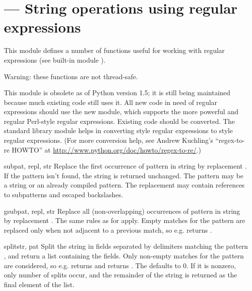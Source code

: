 \section{ ---
         String operations using regular expressions}



This module defines a number of functions useful for working with
regular expressions (see built-in module ).

Warning: these functions are not thread-safe.

This module is obsolete as of Python version 1.5; it is still being
maintained because much existing code still uses it.  All new code in
need of regular expressions should use the new  module, which
supports the more powerful and regular Perl-style regular expressions.
Existing code should be converted.  The standard library module
 helps in converting  style regular
expressions to  style regular expressions.  (For more
conversion help, see Andrew Kuchling's
``regex-to-re HOWTO'' at
\url{http://www.python.org/doc/howto/regex-to-re/}.)


\begin{funcdesc}{sub}{pat, repl, str}
Replace the first occurrence of pattern  in string
 by replacement .  If the pattern isn't found,
the string is returned unchanged.  The pattern may be a string or an
already compiled pattern.  The replacement may contain references
 to subpatterns and escaped backslashes.
\end{funcdesc}

\begin{funcdesc}{gsub}{pat, repl, str}
Replace all (non-overlapping) occurrences of pattern  in
string  by replacement .  The same rules as for
 apply.  Empty matches for the pattern are replaced only
when not adjacent to a previous match, so e.g.
 returns .
\end{funcdesc}

\begin{funcdesc}{split}{str, pat}
Split the string  in fields separated by delimiters matching
the pattern , and return a list containing the fields.  Only
non-empty matches for the pattern are considered, so e.g.
 returns \code{['a', 'b']} and
 returns \code{['abc']}.  The 
defaults to 0. If it is nonzero, only  number of splits
occur, and the remainder of the string is returned as the final
element of the list.
\end{funcdesc}

